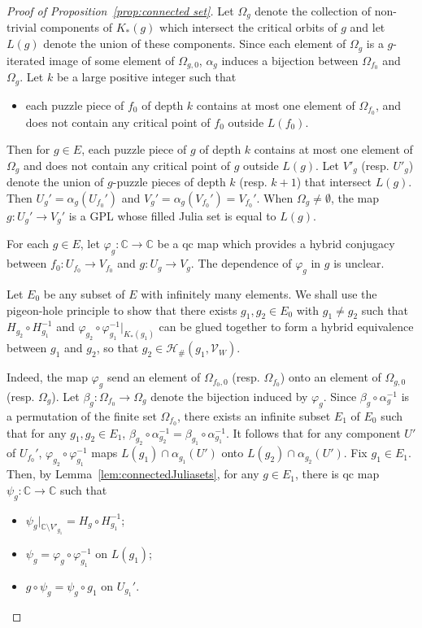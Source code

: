 \documentclass{amsart}
\numberwithin{equation}{section}
\newcommand{\C}{\mathbb C}
\theoremstyle{definition}
\theoremstyle{remark}
\begin{document}
\begin{proof}[Proof of Proposition~\ref{prop:connected set}]
Let $\Omega_g$ denote the collection of non-trivial components of $K_*(g)$ which intersect the critical orbits of $g$ and let $L(g)$ denote the union of these components.  Since each element of $\Omega_g$ 
is a $g$-iterated image of some element of $\Omega_{g,0}$, $\alpha_g$ induces a bijection between $\Omega_{f_0}$ and $\Omega_g$. Let $k$ be a large positive integer such that 
\begin{itemize}
\item each puzzle piece of $f_0$ of depth $k$ contains at most one element of $\Omega_{f_0}$, and does not contain any critical point of $f_0$ outside $L(f_0)$.
\end{itemize}
Then for $g\in E$, each puzzle piece of $g$ of depth $k$ contains at most one element of $\Omega_g$ and does not contain any critical point of $g$ outside $L(g)$. Let $V'_g$ (resp. $U'_g$) denote the union of $g$-puzzle pieces of depth $k$ (resp. $k+1$) that intersect $L(g)$. Then $U_g'=\alpha_g(U_{f_0}')$ and $V_g'=\alpha_g(V_{f_0}')=V_{f_0}'$. When $\Omega_g\not=\emptyset$, the map $g: U_g'\to V_g'$ is a GPL whose filled Julia set is equal to $L(g)$. 
  
For each $g\in E$, let $\varphi_g: \C\to \C$ be a qc map which provides a hybrid conjugacy between $f_0: U_{f_0}\to V_{f_0}$ and $g: U_g\to V_g$. The dependence of $\varphi_g$ in $g$ is unclear. 





 

Let $E_0$ be any subset of $E$ with infinitely many elements. We shall use the pigeon-hole principle to show that there exists $g_1, g_2\in E_0$ with $g_1\not=g_2$ such that $H_{g_2}\circ H_{g_1}^{-1}$ and $\varphi_{g_2}\circ \varphi_{g_1}^{-1}|_{K_*(g_1)}$ can be glued together to form a hybrid equivalence between $g_1$ and $g_2$, so that $g_2\in \mathcal{H}_\#(g_1, \mathcal{V}_W)$.

Indeed, the map $\varphi_g$ send an element of $\Omega_{f_0,0}$ (resp. $\Omega_{f_0}$) onto an element of $\Omega_{g,0}$ (resp. $\Omega_g$). Let $\beta_g: \Omega_{f_0}\to \Omega_g$ denote the bijection induced by $\varphi_g$. 
Since $\beta_g\circ \alpha_g^{-1}$ is a permutation of the finite set $\Omega_{f_0}$, there exists an infinite subset $E_1$ of $E_0$ such that for any $g_1, g_2\in E_1$, $\beta_{g_2}\circ \alpha_{g_2}^{-1}=\beta_{g_1}\circ \alpha_{g_1}^{-1}$.  
It follows that for any component $U'$ of $U_{f_0}'$, $\varphi_{g_2}\circ \varphi_{g_1}^{-1}$ maps $L(g_1)\cap \alpha_{g_1}(U')$ onto $L(g_2)\cap \alpha_{g_2}(U')$. 
Fix $g_1\in E_1$. Then, by Lemma~\ref{lem:connectedJuliasets}, for any $g\in E_1$,  
there is qc map $\psi_g: \C\to \C$ such that 
\begin{itemize}
\item $\psi_g|_{\C\setminus V'_{g_1}}=H_{g}\circ H_{g_1}^{-1}$;
\item $ \psi_g=\varphi_g\circ \varphi_{g_1}^{-1}$ on $L(g_1)$;
\item $g\circ \psi_g=\psi_g\circ g_1$ on $U_{g_1}'$. 
\end{itemize}


\end{proof}
\end{document}
